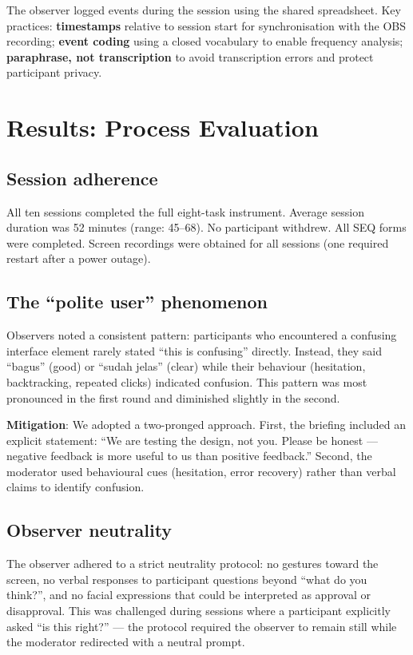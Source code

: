 \documentclass[conference]{IEEEtran}
\begin{document}
The observer logged events during the session using the shared spreadsheet. Key practices:
\textbf{timestamps} relative to session start for synchronisation with the OBS recording; \textbf{event
coding} using a closed vocabulary to enable frequency analysis; \textbf{paraphrase, not transcription}
to avoid transcription errors and protect participant privacy.

\section{Results: Process Evaluation}

\subsection{Session adherence}

All ten sessions completed the full eight-task instrument. Average session duration was 52 minutes
(range: 45--68). No participant withdrew. All SEQ forms were completed. Screen recordings were
obtained for all sessions (one required restart after a power outage).

\subsection{The ``polite user'' phenomenon}

Observers noted a consistent pattern: participants who encountered a confusing interface element rarely
stated ``this is confusing'' directly. Instead, they said ``bagus'' (good) or ``sudah jelas'' (clear)
while their behaviour (hesitation, backtracking, repeated clicks) indicated confusion. This pattern was
most pronounced in the first round and diminished slightly in the second.

\textbf{Mitigation}: We adopted a two-pronged approach. First, the briefing included an explicit
statement: ``We are testing the design, not you. Please be honest --- negative feedback is more useful
to us than positive feedback.'' Second, the moderator used behavioural cues (hesitation, error
recovery) rather than verbal claims to identify confusion.

\subsection{Observer neutrality}

The observer adhered to a strict neutrality protocol: no gestures toward the screen, no verbal
responses to participant questions beyond ``what do you think?'', and no facial expressions that could
be interpreted as approval or disapproval. This was challenged during sessions where a participant
explicitly asked ``is this right?'' --- the protocol required the observer to remain still while the
moderator redirected with a neutral prompt.
\end{document}
